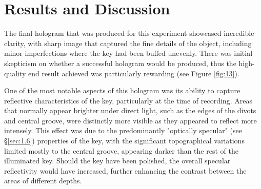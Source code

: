 \documentclass[12pt]{article}
\begin{document}
\section{Results and Discussion} \label{sec:3}

The final hologram that was produced for this experiment showcased incredible clarity, with sharp image that captured the fine details of the object, including minor imperfections where the key had been
buffed unevenly. There was initial skepticism on whether a successful hologram would be produced, thus the high-quality end result achieved was particularly rewarding (see Figure \ref{fig:13}).

One of the most notable aspects of this hologram was its ability to capture reflective characteristics of the key, particularly at the time of recording. Areas that normally appear brighter under direct light,
such as the edges of the divots and central groove, were distinctly more visible as they appeared to reflect more intensely. This effect was due to the predominantly "optically specular" (see §\ref{sec:1.6}) properties of the key,
with the significant topographical variations limited mostly to the central groove, appearing darker than the rest of the illuminated key. Should the key have been polished, the overall specular reflectivity would have increased, further
enhancing the contrast between the areas of different depths.
\end{document}

